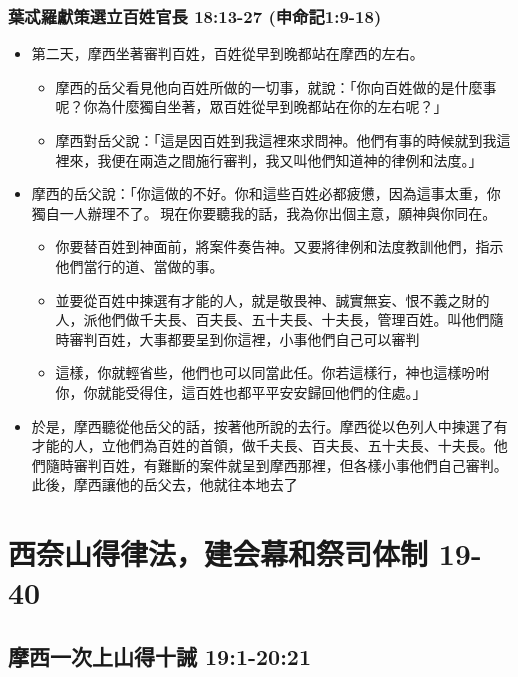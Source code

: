 \subsubsection{葉忒羅獻策選立百姓官長 18:13-27 (申命記1:9-18)}
\begin{itemize} 
\itemsep-.35em
\item 第二天，摩西坐著審判百姓，百姓從早到晚都站在摩西的左右。
\begin{itemize} 
\itemsep-.35em
\item 摩西的岳父看見他向百姓所做的一切事，就說：「你向百姓做的是什麼事呢？你為什麼獨自坐著，眾百姓從早到晚都站在你的左右呢？」
\item 摩西對岳父說：「這是因百姓到我這裡來求問神。他們有事的時候就到我這裡來，我便在兩造之間施行審判，我又叫他們知道神的律例和法度。」 
\end{itemize}
\item 摩西的岳父說：「你這做的不好。你和這些百姓必都疲憊，因為這事太重，你獨自一人辦理不了。 現在你要聽我的話，我為你出個主意，願神與你同在。
\begin{itemize} 
\itemsep-.35em
\item 你要替百姓到神面前，將案件奏告神。又要將律例和法度教訓他們，指示他們當行的道、當做的事。
\item 並要從百姓中揀選有才能的人，就是敬畏神、誠實無妄、恨不義之財的人，派他們做千夫長、百夫長、五十夫長、十夫長，管理百姓。叫他們隨時審判百姓，大事都要呈到你這裡，小事他們自己可以審判
\item 這樣，你就輕省些，他們也可以同當此任。你若這樣行，神也這樣吩咐你，你就能受得住，這百姓也都平平安安歸回他們的住處。」 
\end{itemize}
\item 於是，摩西聽從他岳父的話，按著他所說的去行。摩西從以色列人中揀選了有才能的人，立他們為百姓的首領，做千夫長、百夫長、五十夫長、十夫長。他們隨時審判百姓，有難斷的案件就呈到摩西那裡，但各樣小事他們自己審判。此後，摩西讓他的岳父去，他就往本地去了
\end{itemize}

\section{西奈山得律法，建会幕和祭司体制 19-40}
\subsection{摩西一次上山得十誡 19:1-20:21}
